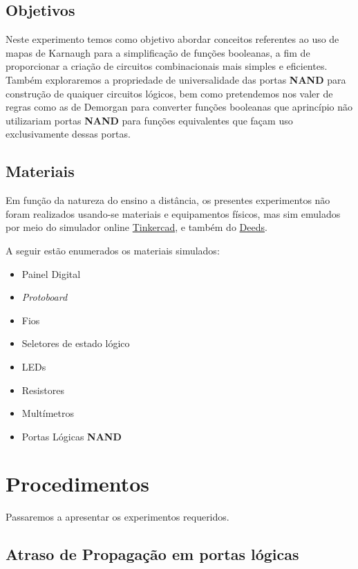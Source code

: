 \documentclass[12pt]{article}
\begin{document}
\subsection{Objetivos}
\label{sec:Objetivos}
Neste experimento temos como objetivo abordar conceitos referentes ao uso de
mapas de Karnaugh para a simplificação de funções booleanas, a fim de
proporcionar a criação de circuitos combinacionais mais simples e eficientes.
Também exploraremos a propriedade de universalidade das portas \textbf{NAND}
para construção de quaiquer circuitos lógicos, bem como pretendemos nos valer de
regras como as de Demorgan para converter funções booleanas que aprincípio não
utilizariam portas \textbf{NAND} para funções equivalentes que façam uso
exclusivamente dessas portas.

\subsection{Materiais}
\label{sec:Materiais}
Em função da natureza do ensino a distância, os presentes experimentos não foram
realizados usando-se materiais e equipamentos físicos, mas sim emulados por meio
do simulador online \href{https://www.tinkercad.com/}{Tinkercad}, e também do
\href{https://www.digitalelectronicsdeeds.com/deeds.html}{Deeds}.

A seguir estão enumerados os materiais simulados:
\begin{itemize}
    \item Painel Digital
    \item \textit{Protoboard}
    \item Fios
    \item Seletores de estado lógico
    \item LEDs
    \item Resistores
    \item Multímetros
    \item Portas Lógicas \textbf{NAND}
\end{itemize}

\section{Procedimentos}
\label{sec:Procedimentos}

Passaremos a apresentar os experimentos requeridos.

\subsection{Atraso de Propagação em portas lógicas}\label{sec:atraso_de_propagação}
\end{document}
